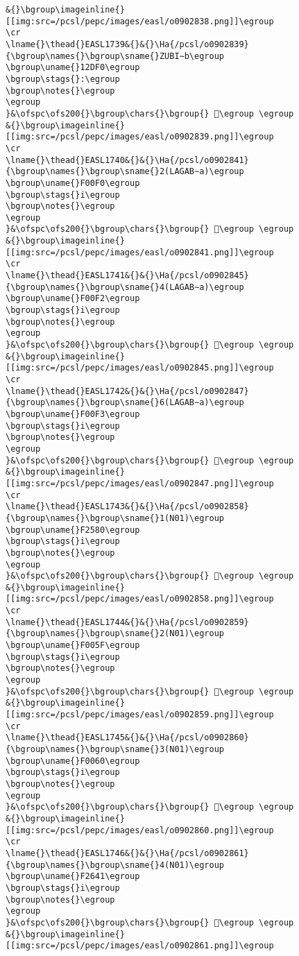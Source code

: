 \begin{verbatim}
&{}\bgroup\imageinline{}[[img:src=/pcsl/pepc/images/easl/o0902838.png]]\egroup
\cr
\lname{}\thead{}EASL1739&{}&{}\Ha{/pcsl/o0902839}{\bgroup\names{}\bgroup\sname{}ZUBI∼b\egroup
\bgroup\uname{}12DF0\egroup
\bgroup\stags{}:\egroup
\bgroup\notes{}\egroup
\egroup
}&\ofspc\ofs200{}\bgroup\chars{}\bgroup{} 𒷰\egroup \egroup
&{}\bgroup\imageinline{}[[img:src=/pcsl/pepc/images/easl/o0902839.png]]\egroup
\cr
\lname{}\thead{}EASL1740&{}&{}\Ha{/pcsl/o0902841}{\bgroup\names{}\bgroup\sname{}2(LAGAB∼a)\egroup
\bgroup\uname{}F00F0\egroup
\bgroup\stags{}i\egroup
\bgroup\notes{}\egroup
\egroup
}&\ofspc\ofs200{}\bgroup\chars{}\bgroup{} 󰃰\egroup \egroup
&{}\bgroup\imageinline{}[[img:src=/pcsl/pepc/images/easl/o0902841.png]]\egroup
\cr
\lname{}\thead{}EASL1741&{}&{}\Ha{/pcsl/o0902845}{\bgroup\names{}\bgroup\sname{}4(LAGAB∼a)\egroup
\bgroup\uname{}F00F2\egroup
\bgroup\stags{}i\egroup
\bgroup\notes{}\egroup
\egroup
}&\ofspc\ofs200{}\bgroup\chars{}\bgroup{} 󰃲\egroup \egroup
&{}\bgroup\imageinline{}[[img:src=/pcsl/pepc/images/easl/o0902845.png]]\egroup
\cr
\lname{}\thead{}EASL1742&{}&{}\Ha{/pcsl/o0902847}{\bgroup\names{}\bgroup\sname{}6(LAGAB∼a)\egroup
\bgroup\uname{}F00F3\egroup
\bgroup\stags{}i\egroup
\bgroup\notes{}\egroup
\egroup
}&\ofspc\ofs200{}\bgroup\chars{}\bgroup{} 󰃳\egroup \egroup
&{}\bgroup\imageinline{}[[img:src=/pcsl/pepc/images/easl/o0902847.png]]\egroup
\cr
\lname{}\thead{}EASL1743&{}&{}\Ha{/pcsl/o0902858}{\bgroup\names{}\bgroup\sname{}1(N01)\egroup
\bgroup\uname{}F2580\egroup
\bgroup\stags{}i\egroup
\bgroup\notes{}\egroup
\egroup
}&\ofspc\ofs200{}\bgroup\chars{}\bgroup{} 󲖀\egroup \egroup
&{}\bgroup\imageinline{}[[img:src=/pcsl/pepc/images/easl/o0902858.png]]\egroup
\cr
\lname{}\thead{}EASL1744&{}&{}\Ha{/pcsl/o0902859}{\bgroup\names{}\bgroup\sname{}2(N01)\egroup
\bgroup\uname{}F005F\egroup
\bgroup\stags{}i\egroup
\bgroup\notes{}\egroup
\egroup
}&\ofspc\ofs200{}\bgroup\chars{}\bgroup{} 󰁟\egroup \egroup
&{}\bgroup\imageinline{}[[img:src=/pcsl/pepc/images/easl/o0902859.png]]\egroup
\cr
\lname{}\thead{}EASL1745&{}&{}\Ha{/pcsl/o0902860}{\bgroup\names{}\bgroup\sname{}3(N01)\egroup
\bgroup\uname{}F0060\egroup
\bgroup\stags{}i\egroup
\bgroup\notes{}\egroup
\egroup
}&\ofspc\ofs200{}\bgroup\chars{}\bgroup{} 󰁠\egroup \egroup
&{}\bgroup\imageinline{}[[img:src=/pcsl/pepc/images/easl/o0902860.png]]\egroup
\cr
\lname{}\thead{}EASL1746&{}&{}\Ha{/pcsl/o0902861}{\bgroup\names{}\bgroup\sname{}4(N01)\egroup
\bgroup\uname{}F2641\egroup
\bgroup\stags{}i\egroup
\bgroup\notes{}\egroup
\egroup
}&\ofspc\ofs200{}\bgroup\chars{}\bgroup{} 󲙁\egroup \egroup
&{}\bgroup\imageinline{}[[img:src=/pcsl/pepc/images/easl/o0902861.png]]\egroup

\end{verbatim}
